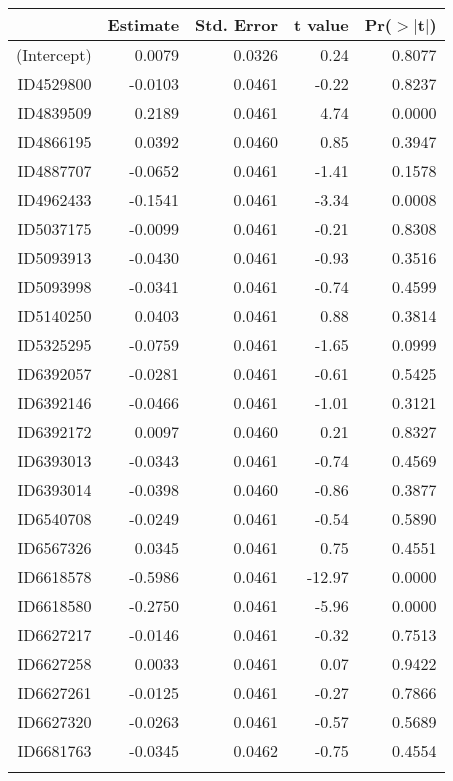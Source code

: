 \begin{table}[ht]
\centering
\begin{tabular}{rrrrr}
  \hline
 & Estimate & Std. Error & t value & Pr($>$$|$t$|$) \\ 
  \hline
(Intercept) & 0.0079 & 0.0326 & 0.24 & 0.8077 \\ 
  ID4529800 & -0.0103 & 0.0461 & -0.22 & 0.8237 \\ 
  ID4839509 & 0.2189 & 0.0461 & 4.74 & 0.0000 \\ 
  ID4866195 & 0.0392 & 0.0460 & 0.85 & 0.3947 \\ 
  ID4887707 & -0.0652 & 0.0461 & -1.41 & 0.1578 \\ 
  ID4962433 & -0.1541 & 0.0461 & -3.34 & 0.0008 \\ 
  ID5037175 & -0.0099 & 0.0461 & -0.21 & 0.8308 \\ 
  ID5093913 & -0.0430 & 0.0461 & -0.93 & 0.3516 \\ 
  ID5093998 & -0.0341 & 0.0461 & -0.74 & 0.4599 \\ 
  ID5140250 & 0.0403 & 0.0461 & 0.88 & 0.3814 \\ 
  ID5325295 & -0.0759 & 0.0461 & -1.65 & 0.0999 \\ 
  ID6392057 & -0.0281 & 0.0461 & -0.61 & 0.5425 \\ 
  ID6392146 & -0.0466 & 0.0461 & -1.01 & 0.3121 \\ 
  ID6392172 & 0.0097 & 0.0460 & 0.21 & 0.8327 \\ 
  ID6393013 & -0.0343 & 0.0461 & -0.74 & 0.4569 \\ 
  ID6393014 & -0.0398 & 0.0460 & -0.86 & 0.3877 \\ 
  ID6540708 & -0.0249 & 0.0461 & -0.54 & 0.5890 \\ 
  ID6567326 & 0.0345 & 0.0461 & 0.75 & 0.4551 \\ 
  ID6618578 & -0.5986 & 0.0461 & -12.97 & 0.0000 \\ 
  ID6618580 & -0.2750 & 0.0461 & -5.96 & 0.0000 \\ 
  ID6627217 & -0.0146 & 0.0461 & -0.32 & 0.7513 \\ 
  ID6627258 & 0.0033 & 0.0461 & 0.07 & 0.9422 \\ 
  ID6627261 & -0.0125 & 0.0461 & -0.27 & 0.7866 \\ 
  ID6627320 & -0.0263 & 0.0461 & -0.57 & 0.5689 \\ 
  ID6681763 & -0.0345 & 0.0462 & -0.75 & 0.4554 \\ 
$$
\end{tabular}
\end{table}
